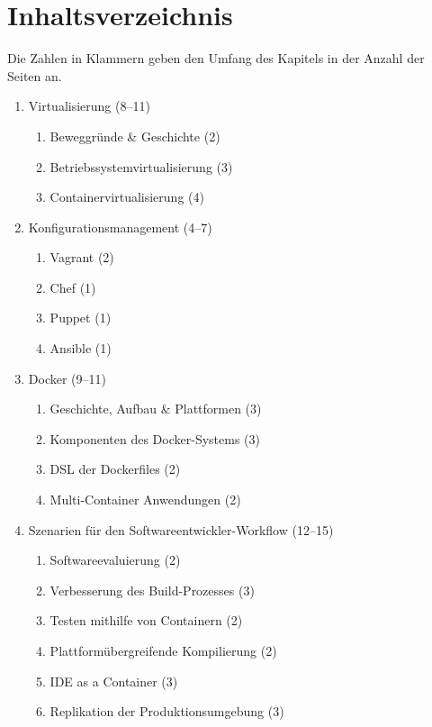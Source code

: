 \documentclass[a4paper, parindent, ngerman]{scrreprt}
\begin{document}
\chapter{Inhaltsverzeichnis}
Die Zahlen in Klammern geben den Umfang des Kapitels in der Anzahl der Seiten an.

\begin{enumerate}[label*=\arabic*.]
    \item Virtualisierung (8--11)
    \begin{enumerate}[label*=\arabic*.]
        \item Beweggründe \& Geschichte (2)
        \item Betriebssystemvirtualisierung (3)
        \item Containervirtualisierung (4)
    \end{enumerate}
    \item Konfigurationsmanagement (4--7)
    \begin{enumerate}[label*=\arabic*.]
        \item Vagrant (2)
        \item Chef (1)
        \item Puppet (1)
        \item Ansible (1)
    \end{enumerate}
    \item Docker (9--11)
    \begin{enumerate}[label*=\arabic*.]
        \item Geschichte, Aufbau \& Plattformen (3)
        \item Komponenten des Docker-Systems (3)
        \item DSL der Dockerfiles (2)
        \item Multi-Container Anwendungen (2)
    \end{enumerate}
    \item Szenarien für den Softwareentwickler-Workflow (12--15)
    \begin{enumerate}[label*=\arabic*.]
        \item Softwareevaluierung (2)
        \item Verbesserung des Build-Prozesses (3)
        \item Testen mithilfe von Containern (2)
        \item Plattformübergreifende Kompilierung (2)
        \item IDE as a Container (3)
        \item Replikation der Produktionsumgebung (3)
    \end{enumerate}
\end{enumerate}
\end{document}
